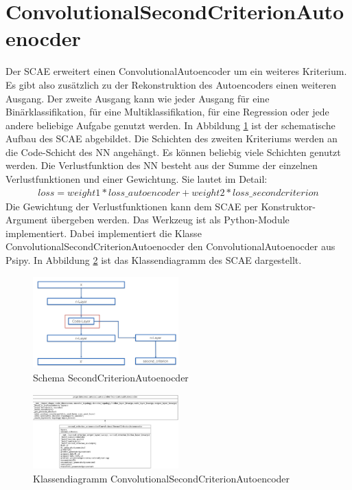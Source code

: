 	\section{ConvolutionalSecondCriterionAutoenocder}
	\label{sec:SecondCriterionAutoenocder}
	Der SCAE erweitert einen ConvolutionalAutoencoder um ein weiteres Kriterium. Es gibt also zusätzlich zu der Rekonstruktion des Autoencoders einen weiteren Ausgang. Der zweite Ausgang kann wie jeder Ausgang für eine Binärklassifikation, für eine Multiklassifikation, für eine Regression oder jede andere beliebige Aufgabe genutzt werden. In Abbildung \ref{img:SchemaSCAE} ist der schematische Aufbau des SCAE abgebildet. Die Schichten des zweiten Kriteriums werden an die Code-Schicht des NN angehängt. Es können beliebig  viele Schichten genutzt werden. Die Verlustfunktion des NN besteht aus der Summe der einzelnen Verlustfunktionen und einer Gewichtung. Sie lautet im Detail: 
	\begin{align}
	loss = weight1 * loss\_autoencoder + weight2 * loss\_secondcriterion
	\end{align}
	Die Gewichtung der Verlustfunktionen kann dem SCAE per Konstruktor-Argument übergeben werden. Das Werkzeug ist als Python-Module implementiert. Dabei implementiert die Klasse ConvolutionalSecondCriterionAutoenocder den ConvolutionalAutoenocder aus Psipy. In Abbildung \ref{img:KlassendiagrammCSCAE} ist das Klassendiagramm des SCAE dargestellt.
	\begin{figure}[h]
		\centering
		\includegraphics[width=0.5\textwidth, center]{bilder/Schema_Autoencoders/Schema_SCAE.png}
		\caption[Schema SecondCriterionAutoenocder]{Schema SecondCriterionAutoenocder}
		\label{img:SchemaSCAE}
	\end{figure}  
	\begin{figure}[h]
		\centering
		\includegraphics[width=0.5\textwidth, center]{bilder/Klassendiagramme/Klassendiagramm_CSCAE.png}
		\caption[Klassendiagramm ConvolutionalSecondCriterionAutoencoder]{Klassendiagramm ConvolutionalSecondCriterionAutoencoder}
	    \label{img:KlassendiagrammCSCAE}
	\end{figure}  
